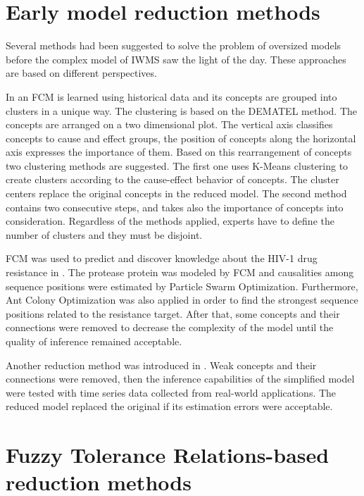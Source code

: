 \documentclass[graybox]{svmult}
\begin{document}
\section{Early model reduction methods}
\label{sec:earlyReduction}

Several methods had been suggested to solve the problem of oversized models before the complex model of IWMS saw the light of the day. These approaches are based on different perspectives.

In \cite{alizadeh2008using} an FCM is learned using historical data and its concepts are grouped into clusters in a unique way. The clustering is based on the DEMATEL \cite{dematel} method. The concepts are arranged on a two dimensional plot. The vertical axis classifies concepts to cause and effect groups, the position of concepts along the horizontal axis expresses the importance of them. Based on this rearrangement of concepts two clustering methods are suggested. The first one uses K-Means clustering to create clusters according to the cause-effect behavior of concepts. The cluster centers replace the original concepts in the reduced model. The second method contains two consecutive steps, and takes also the importance of concepts into consideration. Regardless of the methods applied, experts have to define the number of clusters and they must be disjoint.

FCM was used to predict and discover knowledge about the HIV-1 drug resistance in \cite{NapolesHIV}. The protease protein was modeled by FCM and causalities among sequence positions were estimated by Particle Swarm Optimization. Furthermore, Ant Colony Optimization was also applied in order to find the strongest sequence positions related to the resistance target. After that, some concepts and their connections were removed to decrease the complexity of the model until the quality of inference remained acceptable.

Another reduction method was introduced in \cite{Homenda2014}. Weak concepts and their connections were removed, then the inference capabilities of the simplified model were tested with time series data collected from real-world applications. The reduced model replaced the original if its estimation errors were acceptable.

\section{Fuzzy Tolerance Relations-based reduction methods}
\label{sec:FTR}
\end{document}
